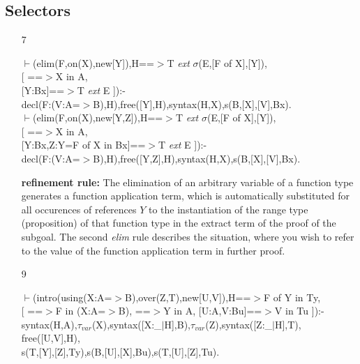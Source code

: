 \documentclass[11pt]{report}
\begin{document}
 \subsection{Selectors}
 \begin{enumerate}
 \item[7]
\begin{sf}\begin{tabbing}
$\vdash$(elim(F,on(X),new[Y]),H==$>$T \mbox{\it ext} $\sigma$(E,[F of X],[Y]),\\[-0.15ex]
\hspace{2em}[ ==$>$X in A, \\[-0.15ex]
\hspace{3em}[Y:Bx]==$>$T \mbox{\it ext} E ]):-\\[-0.15ex]
\hspace{2em}decl(F:(V:A=$>$B),H),free([Y],H),syntax(H,X),s(B,[X],[V],Bx).\\[-0.15ex]
$\vdash$(elim(F,on(X),new[Y,Z]),H==$>$T \mbox{\it ext} $\sigma$(E,[F of X],[Y]),\\[-0.15ex]
\hspace{2em}[ ==$>$X in A, \\[-0.15ex]
\hspace{3em}[Y:Bx,Z:Y=F of X in Bx]==$>$T \mbox{\it ext} E ]):-\\[-0.15ex]
\hspace{2em}decl(F:(V:A=$>$B),H),free([Y,Z],H),syntax(H,X),s(B,[X],[V],Bx).
\end{tabbing}\end{sf}

 {\bf refinement rule:}
 The elimination of an arbitrary variable of a function type 
 generates a function application term, which is automatically
 substituted for all occurences of references $Y$ to the 
 instantiation of the range type (proposition) of that function
 type in the extract term of the proof of the subgoal.
 The second \emph{elim} rule describes the situation, where you
 wish to refer to the value of the function application term
 in further proof. 
 \item[9]
\begin{sf}\begin{tabbing}
$\vdash$(intro(using(X:A=$>$B),over(Z,T),new[U,V]),H==$>$F of Y in Ty, \\[-0.15ex]
\hspace{2em}[ ==$>$F in (X:A=$>$B), ==$>$Y in A, [U:A,V:Bu]==$>$V in Tu ]):-\\[-0.15ex]
\hspace{2em}syntax(H,A),$\tau_{var}$(X),syntax([X:\_\hspace{0.1em}$\mid$H],B),$\tau_{var}$(Z),syntax([Z:\_\hspace{0.1em}$\mid$H],T),\\[-0.15ex]
\hspace{2em}free([U,V],H),\\[-0.15ex]
\hspace{2em}s(T,[Y],[Z],Ty),s(B,[U],[X],Bu),s(T,[U],[Z],Tu).
\end{tabbing}\end{sf}


\end{enumerate}
\end{document}
